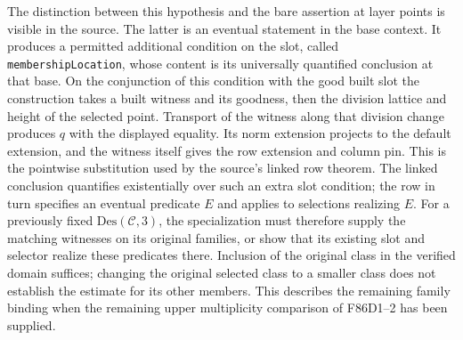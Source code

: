 The distinction between this hypothesis and the bare assertion
at layer points is visible in the source. The latter is an eventual
statement in the base context. It produces a permitted additional
condition on the slot, called \texttt{membershipLocation}, whose
content is its universally quantified conclusion at that base.
On the conjunction of this condition with the good built slot the
construction takes a built witness and its goodness, then the
division lattice and height of the selected point. Transport of the
witness along that division change produces $q$ with the displayed
equality. Its norm extension projects to the default extension,
and the witness itself gives the row extension and column pin.
This is the pointwise substitution used by the source's linked
row theorem. The linked conclusion quantifies existentially over
such an extra slot condition; the row in turn specifies an eventual
predicate $E$ and applies to selections realizing $E$. For a
previously fixed $\mathrm{Des}(\mathcal C,3)$, the specialization
must therefore supply the matching witnesses on its original
families, or show that its existing slot and selector realize
these predicates there. Inclusion of the original class in the
verified domain suffices; changing the original selected class to
a smaller class does not establish the estimate for its other
members. This describes the remaining family binding when the
remaining upper multiplicity comparison of F86D1--2 has been supplied.
